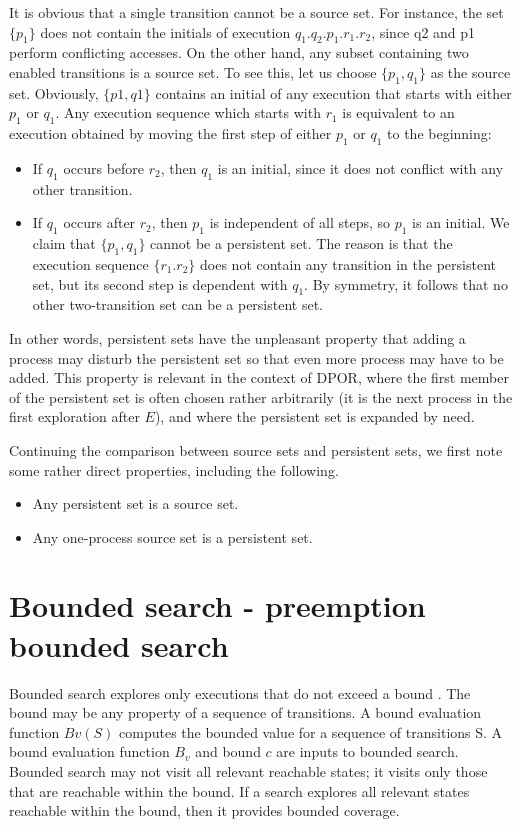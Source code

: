 It is obvious that a single transition cannot be a source set. For
instance, the set $\{ p_1 \}$ does not contain the initials of execution $q_1.q_2.p_1.r_1.r_2$,
since q2 and p1 perform conflicting accesses. On the other hand, any subset
containing two enabled transitions is a source set. To see this, let us choose
$\{p_1, q_1 \}$ as the source set. Obviously, $\{p1, q1 \}$ contains an initial of any execution
that starts with either $p_1$ or $q_1$. Any execution sequence which starts with $r_1$ is
equivalent to an execution obtained by moving the first step of either $p_1$ or $q_1$ to
the beginning:
\begin{itemize}
\item If $q_1$ occurs before $r_2$, then $q_1$ is an initial, since it does not conflict with
any other transition.
\item If $q_1$ occurs after $r_2$, then $p_1$ is independent of all steps, so $p_1$ is an initial.
We claim that $\{p_1, q_1 \}$ cannot be a persistent set. The reason is that the execution
sequence $\{r_1.r_2 \}$ does not contain any transition in the persistent set, but its second
step is dependent with $q_1$. By symmetry, it follows that no other two-transition
set can be a persistent set.
\end{itemize}

In other words, persistent sets have the unpleasant property that adding a process
may disturb the persistent set so that even more process may have to be added.
This property is relevant in the context of DPOR, where the first member of the
persistent set is often chosen rather arbitrarily (it is the next process in the first
exploration after $E$), and where the persistent set is expanded by need.

Continuing the comparison between source sets and persistent sets, we first
note some rather direct properties, including the following.

\begin{itemize}
\item Any persistent set is a source set.
\item Any one-process source set is a persistent set.
\end{itemize}


\section{Bounded search - preemption bounded search}
Bounded search explores only executions that do not exceed
a bound \cite{BPOR,Thomson}. The bound may be any property of a
sequence of transitions. A bound evaluation function $Bv(S)$
computes the bounded value for a sequence of transitions S.
A bound evaluation function $B_v$ and bound $c$ are inputs to
bounded search. Bounded search may not visit all relevant
reachable states; it visits only those that are reachable within
the bound. If a search explores all relevant states reachable
within the bound, then it provides bounded coverage.


